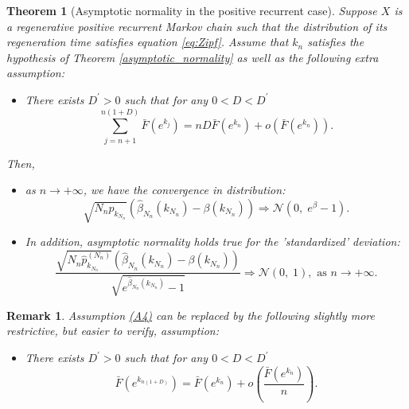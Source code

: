 \documentclass[sn-mathphys-ay]{sn-jnl}%
\newtheorem{theorem}{Theorem}[section]%
\newtheorem{remark}{Remark}%
\newcommand{\AssumpVelocityText}{(A4)}
\newcommand{\AssumpVelocity}{\hyperref[assumpt:AssumpVelocity]{\AssumpVelocityText}}
\newcommand{\AssumpVelocityPrimeText}{(A4')}
\begin{document}
\begin{appendices}
\begin{theorem}[Asymptotic normality in the positive recurrent case]\label{th:asymptotic_normality_positive_recurrent}
    Suppose $X$ is a regenerative positive recurrent Markov chain such that the distribution
    of its regeneration time satisfies equation \eqref{eq:Zipf}. Assume that \(k_n\) satisfies
    the hypothesis of Theorem \ref{asymptotic_normality} as well as the following extra assumption:
    \begin{itemize}
        \item[\AssumpVelocityText]\label{assumpt:AssumpVelocity} There exists $D^\prime>0$ such that for any $0<D<D^{\prime}$
              \begin{equation}
                  \sum_{j=n+1}^{n\left(1+D\right)}{\bar{F}\left(e^{k_j}\right)}= nD\bar{F}\left(e^{k_n}\right)+o\left(\bar{F}\left(e^{k_n}\right)\right).
              \end{equation}
    \end{itemize}
    Then,
    \begin{itemize}
        \item[(i)] as $n\to +\infty$, we have the convergence in distribution:
              \begin{equation*}
                  \sqrt {{N_n} p_{k_{N_n}}} \left(\widehat \beta_{N_n} ({k_{N_n}}) - \beta(k_{N_n}) \right) \Rightarrow \mathcal{N}\left(0,\; e^{\beta}-1\right).
              \end{equation*}
        \item[(ii)]In addition, asymptotic normality holds true for the 'standardized' deviation:
              \begin{equation*}
                  \frac{{\sqrt {{N_n}\widehat p_{{k_{N_n}}}^{({N_n})}} \left( {{{\widehat \beta }_{N_n}}\left( {{k_{N_n}}} \right) - \beta \left( {{k_{N_n}}} \right)} \right)}}{{\sqrt {{e^{{{\widehat \beta }_{N_n}}\left( {{k_{N_n}}} \right)}} - 1} }}\Rightarrow \mathcal{N}\left( {0,\; 1} \right), \text{ as } n\to +\infty.
              \end{equation*}
    \end{itemize}
\end{theorem}

\begin{remark} Assumption {\AssumpVelocity} can be replaced by the following slightly more
    restrictive, but easier to verify, assumption:
    \begin{itemize}
        \item[\AssumpVelocityPrimeText]\label{assumpt:AssumpVelocityPrime} There exists $D^\prime>0$ such that for any $0<D<D^{\prime}$
              \begin{equation*}
                  \bar{F}\left(e^{k_{n(1+D)}}\right)=\bar{F}\left(e^{k_n}\right)+o\left(\frac{\bar{F}\left(e^{k_n}\right)}{n}\right).
              \end{equation*}
    \end{itemize}
\end{remark}


\end{appendices}
\end{document}
